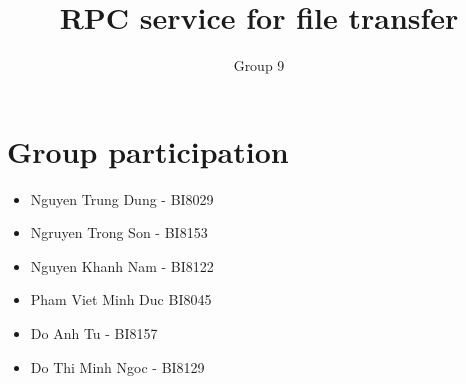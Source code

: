 \documentclass{article}
\author{Group 9}
\title{RPC service for file transfer}
\begin{document}
\maketitle
\section{Group participation}
\begin{itemize}
\item Nguyen Trung Dung - BI8029
\item Ngruyen Trong Son - BI8153
\item Nguyen Khanh Nam - BI8122
\item Pham Viet Minh Duc BI8045
\item Do Anh Tu - BI8157
\item Do Thi Minh Ngoc - BI8129
\end{itemize}
\end{document}
